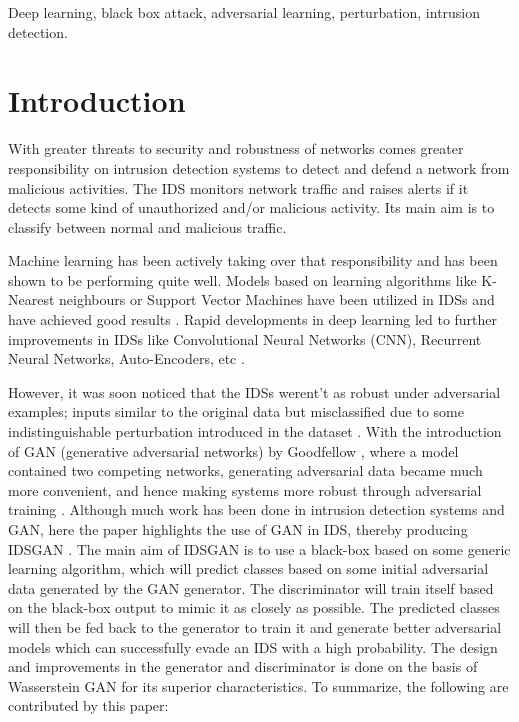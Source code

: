 \documentclass[10pt, conference, compsocconf]{IEEEtran}
\begin{document}
\begin{IEEEkeywords}
Deep learning, black box attack, adversarial learning, perturbation, intrusion detection.
\end{IEEEkeywords}


\section {Introduction}

With greater threats to security and robustness of networks comes greater responsibility on intrusion detection systems to detect and defend a network from malicious activities. The IDS monitors network traffic and raises alerts if it detects some kind of unauthorized and/or malicious activity. Its main aim is to classify between normal and malicious traffic.

Machine learning has been actively taking over that responsibility and has been shown to be performing quite well. Models based on learning algorithms like K-Nearest neighbours or Support Vector Machines have been utilized in IDSs and have achieved good results {\cite{tsai2009intrusion}}. Rapid developments in deep learning led to further improvements in IDSs like Convolutional Neural Networks (CNN), Recurrent Neural Networks, Auto-Encoders, etc \cite{li2017intrusion} \cite{li2018character}.

However, it was soon noticed that the IDSs werent't as robust under adversarial examples; inputs similar to the original data but misclassified due to some indistinguishable perturbation introduced in the dataset \cite{carlini2017adv}. With the introduction of GAN (generative adversarial networks) by Goodfellow \cite{goodfellow2014gan}, where a model contained two competing networks, generating adversarial data became much more convenient, and hence making systems more robust through adversarial training \cite{kim2017malware}. Although much work has been done in intrusion detection systems and GAN, here the paper highlights the use of GAN in IDS, thereby producing IDSGAN \cite{lin2018idsgan}. The main aim of IDSGAN is to use a black-box based on some generic learning algorithm, which will predict classes based on some initial adversarial data generated by the GAN generator. The discriminator will train itself based on the black-box output to mimic it as closely as possible. The predicted classes will then be fed back to the generator to train it and generate better adversarial models which can successfully evade an IDS with a high probability. The design and improvements in the generator and discriminator is done on the basis of Wasserstein GAN\cite{arjovsky2017gan} for its superior characteristics. To summarize, the following are contributed by this paper:
\end{document}
